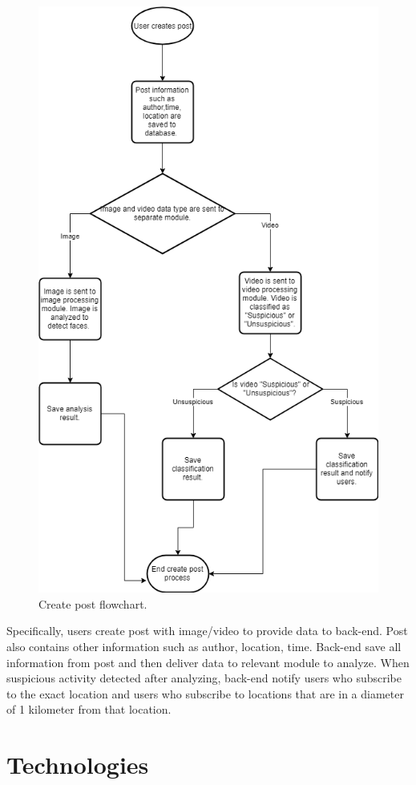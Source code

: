\begin{center}
	\begin{figure}[H]
		\centering
		\includegraphics[width=0.7\columnwidth]{images/chap4/createpostflowchart.png}
		\caption{Create post flowchart.}
	\end{figure}
\end{center}

Specifically, users create post with image/video to provide data to back-end. Post also contains other information such as author, location, time. Back-end save all information from post and then deliver data to relevant module to analyze. When suspicious activity detected after analyzing, back-end notify users who subscribe to the exact location and users who subscribe to locations that are in a diameter of 1 kilometer from that location.

\section{Technologies}
